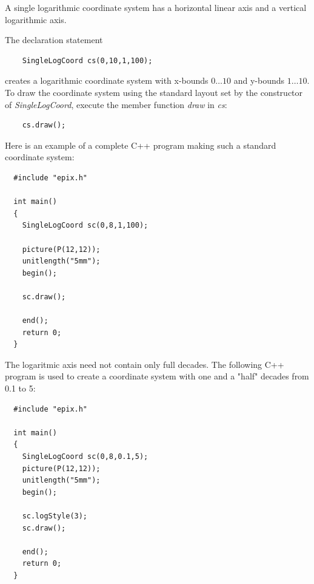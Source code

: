 \documentclass[12pt,a4paper]{article}
\begin{document}
  A single logarithmic coordinate system has a horizontal linear axis and a
  vertical logarithmic axis.

  The declaration statement

  \begin{lstlisting}
    SingleLogCoord cs(0,10,1,100);
  \end{lstlisting}

  creates a logarithmic coordinate system with x-bounds $0\ldots10$ and y-bounds
  $1\ldots10$. To draw the coordinate system using the standard layout set by
  the constructor of \textit{SingleLogCoord}, execute the member function
  \textit{draw} in \textit{cs}:

  \begin{lstlisting}
    cs.draw();
  \end{lstlisting}

  Here is an example of a complete C++ program making such a standard coordinate
  system:

  \begin{minipage}{7.5cm}
    \begin{lstlisting}
  #include "epix.h"

  int main()
  {
    SingleLogCoord sc(0,8,1,100);

    picture(P(12,12));
    unitlength("5mm");
    begin();

    sc.draw();

    end();
    return 0;
  }
    \end{lstlisting}
  \end{minipage}
  \begin{minipage}{5.5cm}
    
  \end{minipage}

  The logaritmic axis need not contain only full decades. The following C++
  program is used to create a coordinate system with one and a "half" decades
  from 0.1 to 5:

  \begin{minipage}{7.5cm}
    \begin{lstlisting}
  #include "epix.h"

  int main()
  {
    SingleLogCoord sc(0,8,0.1,5);
    picture(P(12,12));
    unitlength("5mm");
    begin();

    sc.logStyle(3);
    sc.draw();

    end();
    return 0;
  }
    \end{lstlisting}
  \end{minipage}
  \begin{minipage}{5.5cm}
    
  \end{minipage}
\end{document}
